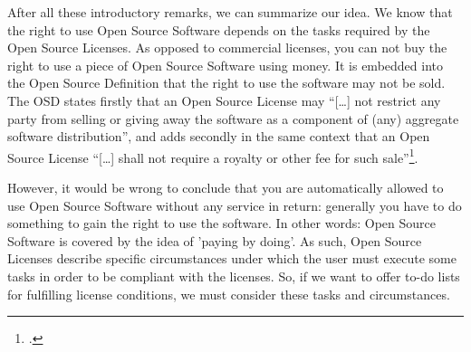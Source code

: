 %
%
%
%
%




After all these introductory remarks, we can summarize our idea. We know that
the right to use Open Source Software depends on the tasks required by the Open
Source Licenses. As opposed to commercial licenses, you can not buy the right to
use a piece of Open Source Software using money. It is embedded into the Open
Source Definition that the right to use the software may not be sold. The OSD
states firstly that an Open Source License may \enquote{[\ldots] not restrict any
party from selling or giving away the software as a component of (any) aggregate
software distribution}, and adds secondly in the same context that an Open
Source License \enquote{[\ldots] shall not require a royalty or other fee for such
sale}\footcite[cf.][\nopage wp. §1]{OSI2012a}.

However, it would be wrong to conclude that you are automatically allowed to use
Open Source Software without any service in return: generally you have to do
something to gain the right to use the software. In other words: Open Source
Software is covered by the idea of ’paying by doing’. As such, Open Source
Li\-cen\-ses describe specific circumstances under which the user must execute
some tasks in order to be compliant with the licenses. So, if we want to offer
to-do lists for fulfilling license conditions, we must consider these tasks and
circumstances.


